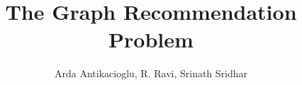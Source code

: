 \documentclass[11pt]{article}
\begin{document}
\title{The Graph Recommendation Problem}
\author{Arda Antikacioglu, R. Ravi, Srinath Sridhar}
\maketitle










{}

\end{document}
